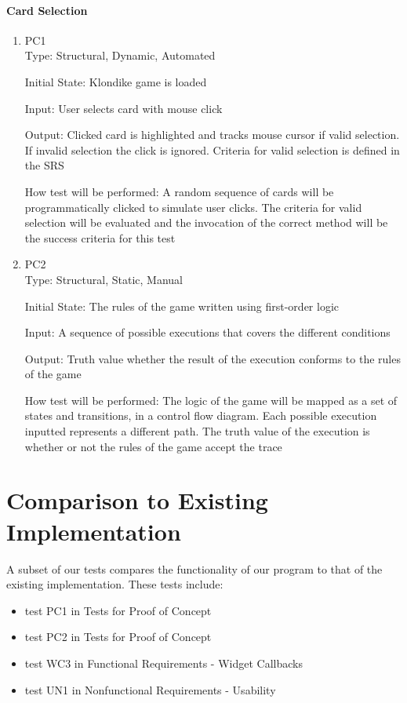 \documentclass[12pt, titlepage]{article}
\begin{document}
	\paragraph{Card Selection}
	\begin{enumerate}
		\item{PC1\\}
		Type: Structural, Dynamic, Automated
		
		Initial State: Klondike game is loaded
		
		Input: User selects card with mouse click
		
		Output: Clicked card is highlighted and tracks mouse cursor if valid 
		selection. If invalid selection the click is ignored. Criteria for valid 
		selection is defined in the SRS 
		
		How test will be performed: A random sequence of cards will be
		programmatically clicked to simulate user clicks. The criteria for valid 
		selection will be evaluated and the invocation of the correct method will be
		the success criteria for this test

		\item{PC2\\}
		Type: Structural, Static, Manual
		
		Initial State: The rules of the game written using first-order logic
		
		Input: A sequence of possible executions that covers the different conditions
		
		Output: Truth value whether the result of the execution conforms to the rules
		of the game
		
		How test will be performed: The logic of the game will be mapped as a set of
		states and transitions, in a control flow diagram. Each possible execution
		inputted represents a different path. The truth value of the execution is
		whether or not the rules of the game accept the trace
	\end{enumerate} 

	\section{Comparison to Existing Implementation}
		A subset of our tests compares the functionality of our program to that of the
		existing implementation. These tests include: 
	\begin{itemize}
		\itemsep0em
		\item test PC1 in Tests for Proof of Concept
		\item test PC2 in Tests for Proof of Concept
		\item test WC3 in Functional Requirements - Widget Callbacks
		\item test UN1 in Nonfunctional Requirements - Usability
	\end{itemize}
		
\end{document}
